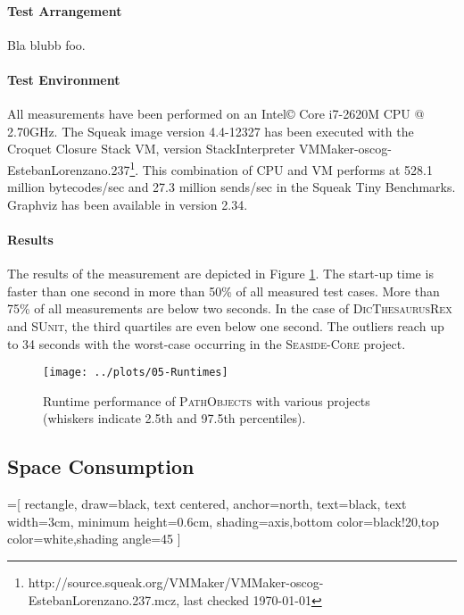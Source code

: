 \paragraph{Test Arrangement}
Bla blubb foo.

\paragraph{Test Environment}
All measurements have been performed on an Intel\copyright{} Core\texttrademark{}  i7-2620M CPU @ 2.70GHz.
The Squeak image version 4.4-12327 has been executed with the Croquet Closure Stack VM, version StackInterpreter VMMaker-oscog-EstebanLorenzano.237\footnote{http://source.squeak.org/VMMaker/VMMaker-oscog-EstebanLorenzano.237.mcz, last checked \today}. 
This combination of CPU and VM performs at 528.1 million bytecodes/sec and 27.3 million sends/sec in the Squeak Tiny Benchmarks. Graphviz has been available in version 2.34.

\paragraph{Results}
The results of the measurement are depicted in Figure \ref{f:DiscussionRuntime}.
The start-up time is faster than one second in more than 50\% of all measured test cases.
More than 75\% of all measurements are below two seconds.
In the case of \textsc{DicThesaurusRex} and \textsc{SUnit}, the third quartiles are even below one second.
The outliers reach up to 34 seconds with the worst-case occurring in the \textsc{Seaside-Core} project.

\begin{figure}[h!]
	\centering
	\texttt{[image: ../plots/05-Runtimes]}
	\caption[Runtime Performance of \textsc{PathObjects}]{Runtime performance of \textsc{PathObjects} with various projects (whiskers indicate 2.5th and 97.5th percentiles).}
	\label{f:DiscussionRuntime}
\end{figure}

\subsection{Space Consumption}
\label{ss:DiscussionSpace}

\usetikzlibrary{positioning,shapes,shadows,arrows}
=[
	rectangle,
	draw=black,
	text centered,
	anchor=north,
	text=black,
	text width=3cm,
	minimum height=0.6cm,
	shading=axis,bottom color=black!20,top color=white,shading angle=45
	]
	
